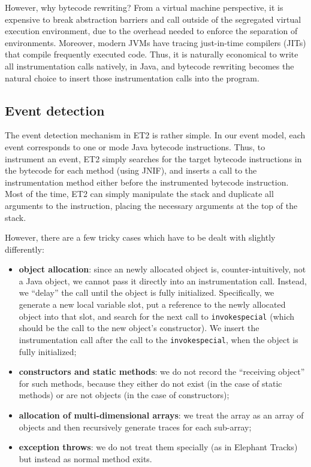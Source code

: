 However, why bytecode rewriting? From a virtual machine perspective, it is expensive to break abstraction barriers and call outside of the
segregated virtual execution environment, due to the overhead needed to enforce the separation of environments. Moreover, modern JVMs have
tracing just-in-time compilers (JITs) that compile frequently executed code. Thus, it is naturally economical to write all instrumentation
calls natively, in Java, and bytecode rewriting becomes the natural choice to insert those instrumentation calls into the program. 

\subsection{Event detection}
The event detection mechanism in ET2 is rather simple. In our event model, each event corresponds to one or mode Java bytecode instructions.
Thus, to instrument an event, ET2 simply searches for the target bytecode instructions in the bytecode for each method (using JNIF), and
inserts a call to the instrumentation method either before the instrumented bytecode instruction. Most of the time, ET2 can simply
manipulate the stack and duplicate all arguments to the instruction, placing the necessary arguments at the top of the stack.

However, there are a few tricky cases which have to be dealt with slightly differently:
\begin{itemize}
\item \textbf{object allocation}: since an newly allocated object is, counter-intuitively, not a Java object, we cannot pass it directly into
  an instrumentation call. Instead, we ``delay'' the call until the object is fully initialized. Specifically, we generate a new local variable
  slot, put a reference to the newly allocated object into that slot, and search for the next call to \lstinline{invokespecial} (which should be
  the call to the new object's constructor). We insert the instrumentation call after the call to the \lstinline{invokespecial}, when the object
  is fully initialized;
\item \textbf{constructors and static methods}: we do not record the ``receiving object'' for such methods, because they either do not exist
  (in the case of static methods) or are not objects (in the case of constructors);
\item \textbf{allocation of multi-dimensional arrays}: we treat the array as an array of objects and then recursively generate traces for each
  sub-array;
\item \textbf{exception throws}: we do not treat them specially (as in Elephant Tracks) but instead as normal method exits.
\end{itemize}

